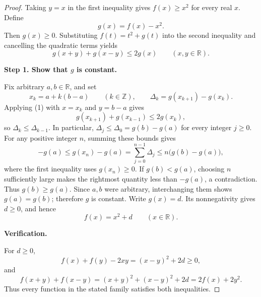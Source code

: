 
\begin{dlsummary}[title={\bfseries Solution 30. The Quadratic--Difference Squeeze},breakable]

\begin{proof}
Taking $y=x$ in the first inequality gives $f(x)\geq x^2$ for every
real $x$. Define
\[
g(x)=f(x)-x^2.
\]
Then $g(x)\geq0$. Substituting $f(t)=t^2+g(t)$ into the second
inequality and cancelling the quadratic terms yields
\[
g(x+y)+g(x-y)\leq2g(x)\qquad(x,y\in\mathbb R). \tag{1}
\]

\medskip
\noindent
\textbf{Step 1. Show that $g$ is constant.}

Fix arbitrary $a,b\in\mathbb R$, and set
\[
x_k=a+k(b-a)\qquad(k\in\mathbb Z),
\qquad
\Delta_k=g(x_{k+1})-g(x_k).
\]
Applying (1) with $x=x_k$ and $y=b-a$ gives
\[
g(x_{k+1})+g(x_{k-1})\leq2g(x_k),
\]
so $\Delta_k\leq\Delta_{k-1}$. In particular,
$\Delta_j\leq\Delta_0=g(b)-g(a)$ for every integer $j\geq0$.
For any positive integer $n$, summing these bounds gives
\[
-g(a)\leq g(x_n)-g(a)
=\sum_{j=0}^{n-1}\Delta_j
\leq n\bigl(g(b)-g(a)\bigr),
\]
where the first inequality uses $g(x_n)\geq0$.
If $g(b)<g(a)$, choosing $n$ sufficiently large makes the rightmost
quantity less than $-g(a)$, a contradiction. Thus $g(b)\geq g(a)$.
Since $a,b$ were arbitrary, interchanging them shows $g(a)=g(b)$;
therefore $g$ is constant. Write $g(x)=d$. Its nonnegativity gives
$d\geq0$, and hence
\[
f(x)=x^2+d\qquad(x\in\mathbb R).
\]

\medskip
\noindent
\textbf{Verification.}

For $d\geq0$,
\[
f(x)+f(y)-2xy=(x-y)^2+2d\geq0,
\]
and
\[
f(x+y)+f(x-y)
=(x+y)^2+(x-y)^2+2d
=2f(x)+2y^2.
\]
Thus every function in the stated family satisfies both inequalities.
\end{proof}

\end{dlsummary}
